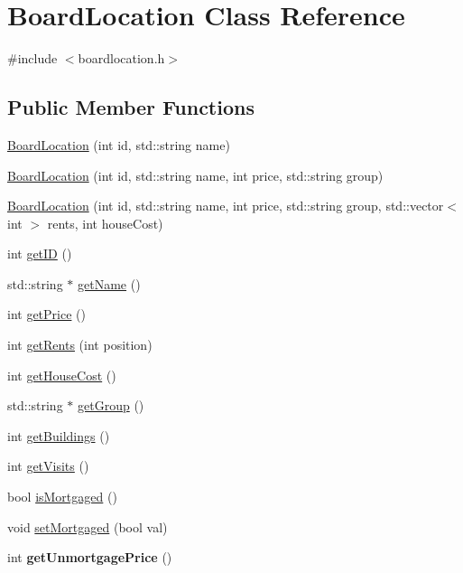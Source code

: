 \hypertarget{classBoardLocation}{\section{Board\-Location Class Reference}
\label{classBoardLocation}
}


{\ttfamily \#include $<$boardlocation.\-h$>$}

\subsection*{Public Member Functions}
\begin{DoxyCompactItemize}
\item 
\hyperlink{classBoardLocation_ade2c00bdc739988bfedc5e5368eeca97}{Board\-Location} (int id, std\-::string name)
\item 
\hyperlink{classBoardLocation_a1f6f4de50dd82d31e940043a7c553e27}{Board\-Location} (int id, std\-::string name, int price, std\-::string group)
\item 
\hyperlink{classBoardLocation_a445a7d8cc883db777b00c55db35c5c9b}{Board\-Location} (int id, std\-::string name, int price, std\-::string group, std\-::vector$<$ int $>$ rents, int house\-Cost)
\item 
int \hyperlink{classBoardLocation_af61f5652c408d8dbe0c556ff3720ac6e}{get\-I\-D} ()
\item 
std\-::string $\ast$ \hyperlink{classBoardLocation_a3b0aaecb1cee0bcbe0e51a57156c2f29}{get\-Name} ()
\item 
int \hyperlink{classBoardLocation_a439915cd2b139a9f4e984bc128a6698c}{get\-Price} ()
\item 
int \hyperlink{classBoardLocation_ad8e8d65b497abc3ae9ae8933f2d2cbb1}{get\-Rents} (int position)
\item 
int \hyperlink{classBoardLocation_a7582f77f5384440821fd2daeecd2cf18}{get\-House\-Cost} ()
\item 
std\-::string $\ast$ \hyperlink{classBoardLocation_a20f2de2633e722056b948873068f1769}{get\-Group} ()
\item 
int \hyperlink{classBoardLocation_a15a965f4ecc9fb08ff16ff3c64829622}{get\-Buildings} ()
\item 
int \hyperlink{classBoardLocation_aa2e474a72d3c00240af67515c1aea19e}{get\-Visits} ()
\item 
bool \hyperlink{classBoardLocation_a10c6ff8ca20cb81aeb0c86a30cb040bc}{is\-Mortgaged} ()
\item 
void \hyperlink{classBoardLocation_a2b1d6ee62fc85723a11ed94b9cf4e865}{set\-Mortgaged} (bool val)
\item 
\hypertarget{classBoardLocation_a4a205f21c8b911137b77dd23754f7346}{int {\bfseries get\-Unmortgage\-Price} ()}\label{classBoardLocation_a4a205f21c8b911137b77dd23754f7346}


\end{DoxyCompactItemize}
